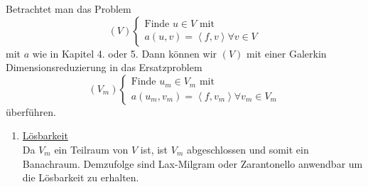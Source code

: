 Betrachtet man das Problem
\begin{equation*}
	\left(V\right)\begin{cases}
		\text{Finde }u\in V\text{ mit}\\
		a\left(u,v\right)=\left<f,v\right> \forall v\in V
	\end{cases}
\end{equation*}
mit $a$ wie in Kapitel 4. oder 5. Dann können wir $\left(V\right)$ mit einer Galerkin Dimensionsreduzierung in das Ersatzproblem
\begin{equation*}
	\left(V_{m}\right)\begin{cases}
		\text{Finde }u_{m}\in V_{m}\text{ mit}\\
		a\left(u_{m},v_{m}\right) = \left<f,v_{m}\right> \forall v_{m}\in V_{m}
	\end{cases}
\end{equation*}
überführen. 
\begin{enumerate}
	\item \underline{Lösbarkeit}\\
		Da $V_{m}$ ein Teilraum von $V$ ist, ist $V_{m}$ abgeschlossen und somit ein Banachraum. Demzufolge sind Lax-Milgram oder Zarantonello anwendbar um die Lösbarkeit zu erhalten.
\end{enumerate}
